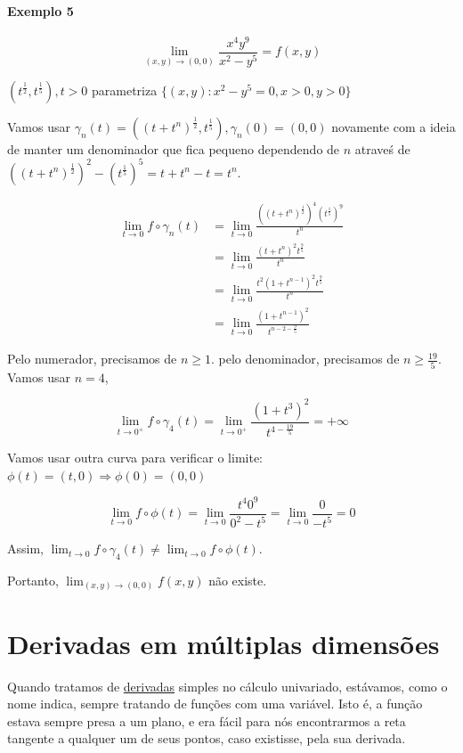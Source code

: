\documentclass[
  letterpaper,
  DIV=11,
  numbers=noendperiod]{scrreprt}
\begin{document}
\subsubsection{Exemplo 5}\label{exemplo-5}

\[
\lim_{(x,y)\rightarrow(0,0)} \frac{x^4 y^9}{x^2-y^5} = f(x,y)
\]

\((t^\frac{1}{2}, t^{\frac{1}{5}}), t > 0\) parametriza
\(\{(x,y):x^2-y^5=0, x>0, y>0\}\)

Vamos usar
\(\gamma_n(t) = \left((t+t^n)^{\frac{1}{2}}, t^{\frac{1}{5}}\right), \gamma_n(0) = (0,0)\)
novamente com a ideia de manter um denominador que fica pequeno
dependendo de \(n\) atraveś de
\(((t+t^n)^{\frac{1}{2}})^2 - (t^{\frac{1}{5}})^5 = t+t^n -t = t^n\).

\[
\begin{aligned}
\lim_{t\rightarrow 0} f \circ \gamma_n(t) &= \lim_{t\rightarrow 0}
\frac{\left((t+t^n)^{\frac{1}{2}}\right)^4 (t^\frac{1}{5})^9}{t^n} \\
& = \lim_{t\rightarrow 0} \frac{(t+t^n)^2 t^{\frac{9}{5}}}{t^n} \\
& = \lim_{t\rightarrow 0} \frac{t^2 (1+t^{n-1})^2 t^{\frac{9}{5}}}{t^n} \\
& = \lim_{t\rightarrow 0} \frac{(1+t^{n-1})^2}{t^{n-2-\frac{9}{5}}}
\end{aligned}
\]

Pelo numerador, precisamos de \(n \geq 1\). pelo denominador, precisamos
de \(n \geq \frac{19}{5}\). Vamos usar \(n = 4\),

\[
\lim_{t\rightarrow 0^{+}} f \circ \gamma_4(t) = \lim_{t\rightarrow 0^{+}}
\frac{(1+t^3)^2}{t^{4-\frac{19}{5}}} = +\infty
\]

Vamos usar outra curva para verificar o limite:
\(\phi(t) = (t,0) \Rightarrow \phi(0) = (0,0)\)

\[
\lim_{t\rightarrow 0} f \circ \phi (t) = \lim_{t \rightarrow 0} \frac{t^4 0^9}{0^2 -t^5} 
= \lim_{t\rightarrow 0} \frac{0}{-t^5} = 0
\]

Assim,
\(\lim_{t\rightarrow 0} f \circ \gamma_4(t) \neq \lim_{t\rightarrow 0} f \circ \phi (t)\).

Portanto, \(\lim_{(x,y) \rightarrow (0,0)} f(x,y)\) não existe.

\chapter{Derivadas em múltiplas
dimensões}\label{derivadas-em-muxfaltiplas-dimensuxf5es}

Quando tratamos de \href{d-simples.qmd}{derivadas} simples no cálculo
univariado, estávamos, como o nome indica, sempre tratando de funções
com uma variável. Isto é, a função estava sempre presa a um plano, e era
fácil para nós encontrarmos a reta tangente a qualquer um de seus
pontos, caso existisse, pela sua derivada.
\end{document}
